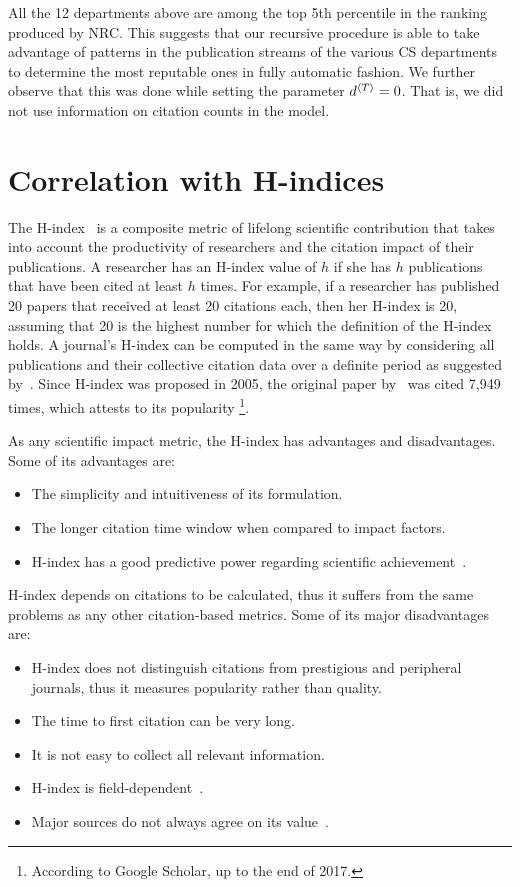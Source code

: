 \documentclass[man]{apa6}
\let \citeA \textcite
\let \cite \parencite
\begin{document}
All the 12 departments above are among the top 5th percentile in the ranking produced by NRC. 
This suggests that our recursive procedure is able to take advantage of patterns in the publication 
streams of the various CS departments to determine the most reputable ones in fully automatic fashion.
We further observe that this was done while setting the parameter $d{^{\langle T \rangle}} = 0$. That is, we did 
not use information on citation counts in the model. 

\section{Correlation with H-indices} 
\label{sec:correlation}

The H-index~\cite{Hirsch2005} is a composite metric of lifelong scientific contribution that takes 
into account the productivity of researchers and the citation impact of their publications.
A researcher has an H-index value of $ h $ if she has $ h $ publications that have been cited at 
least $ h $ times. For example, if a researcher has published 20 papers that received at least 20 
citations each, then her H-index is 20, assuming that 20 is the highest number for which the 
definition of the H-index holds. A journal's H-index can be computed 
in the same way by considering all publications and their collective citation data over a 
definite period as suggested by~\citeA{Braun2006}.
Since H-index was proposed in 2005, the original paper by~\citeA{Hirsch2005} was 
cited 7,949 times, which attests to its popularity 
\footnote{According to Google Scholar, up to the end of 2017.}.

As any scientific impact metric, the H-index has advantages and disadvantages. 
Some of its advantages are:

\begin{itemize}
\item The simplicity and intuitiveness of its formulation.
\item The longer citation time window when compared to impact factors.
\item H-index has a good predictive power regarding scientific achievement~\cite{Bornmann2005, Hirsch2007}.
\end{itemize}

H-index depends on citations to be calculated, thus it suffers from the 
same problems as any other citation-based metrics. Some of its major disadvantages are:

\begin{itemize}
\item H-index does not distinguish citations from prestigious and peripheral journals, thus 
it measures popularity rather than quality.
\item The time to first citation can be very long.
\item It is not easy to collect all relevant information.
\item H-index is field-dependent~\cite{Wendl2007}.
\item Major sources do not always agree on its value~\cite{Bar-Ilan2008}. 
\end{itemize}
\end{document}
